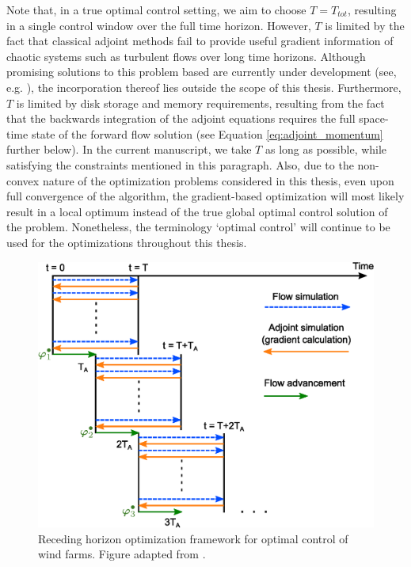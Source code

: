Note that, in a true optimal control setting, we aim to choose $T = T_{tot}$, resulting in a single control window over the full time horizon. However, $T$ is limited by the fact that classical adjoint methods fail to provide useful gradient information of chaotic systems such as turbulent flows over long time horizons. Although promising solutions to this problem based are currently under development (see, e.g. \citealp{wang2014least, chater2016simplified}), the incorporation thereof lies outside the scope of this thesis. Furthermore, $T$ is limited by disk storage and memory requirements, resulting from the fact that the backwards integration of the adjoint equations requires the full space-time state of the forward flow solution (see Equation \ref{eq:adjoint_momentum} further below). In the current manuscript, we take $T$ as long as possible, while satisfying the constraints mentioned in this paragraph. Also, due to the non-convex nature of the optimization problems considered in this thesis, even upon full convergence of the algorithm, the gradient-based optimization will most likely result in a local optimum instead of the true global optimal control solution of the problem. Nonetheless, the terminology `optimal control' will continue to be used for the optimizations throughout this thesis. 

\begin{figure}[]
	\centering
	\includegraphics[width=0.8\linewidth]{chapters/optimal_control_problem/figure2_bw.eps}
	\caption[Receding horizon optimization framework for optimal control of wind farms.]{Receding horizon optimization framework for optimal control of wind farms. Figure adapted from \cite{goit2015optimal}.}
	\label{fig:drawing_receding_horizon}
\end{figure}

